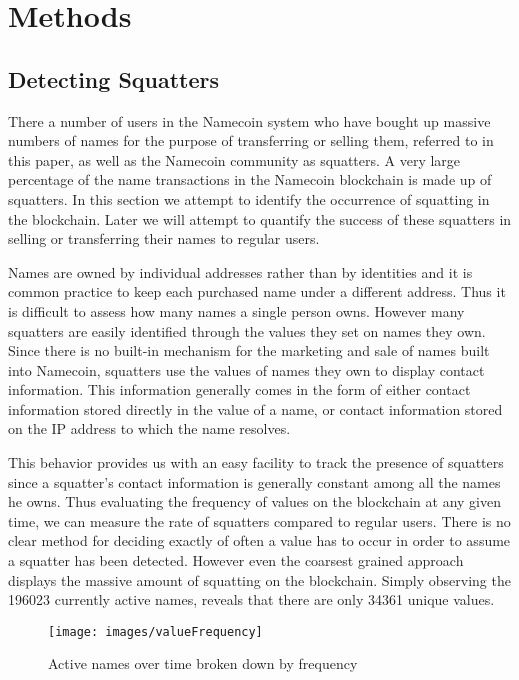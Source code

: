 \section{Methods}

\label{sec:methods}

\subsection{Detecting Squatters}
There a number of users in the Namecoin system who have bought up massive numbers of names for the purpose of transferring or selling them, referred to in this paper, as well as the Namecoin community as squatters. A very large percentage of the name transactions in the Namecoin blockchain is made up of squatters. In this section we attempt to identify the occurrence of squatting in the blockchain. Later we will attempt to quantify the success of these squatters in selling or transferring their names to regular users.

Names are owned by individual addresses rather than by identities and it is common practice to keep each purchased name under a different address. Thus it is difficult to assess how many names a single person owns. However many squatters are easily identified through the values they set on names they own. Since there is no built-in mechanism for the marketing and sale of names built into Namecoin, squatters use the values of names they own to display contact information. This information generally comes in the form of either contact information stored directly in the value of a name, or contact information stored on the IP address to which the name resolves.

This behavior provides us with an easy facility to track the presence of squatters since a squatter's contact information is generally constant among all the names he owns. Thus evaluating the frequency of values on the blockchain at any given time, we can measure the rate of squatters compared to regular users.
There is no clear method for deciding exactly of often a value has to occur in order to assume a squatter has been detected. However even the coarsest grained approach displays the massive amount of squatting on the blockchain. Simply observing the 196023 currently active names, reveals that there are only 34361 unique values.

\begin{figure*}[t]
\centering
\texttt{[image: images/valueFrequency]}
\caption{Active names over time broken down by frequency}
\end{figure*}

